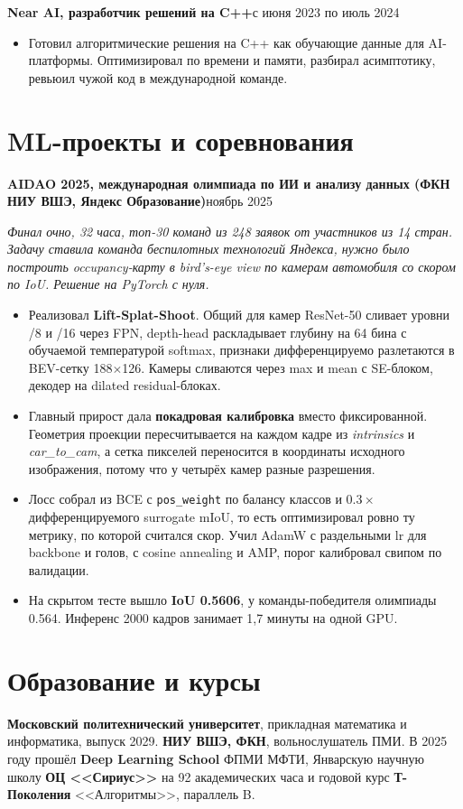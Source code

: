 \documentclass[10pt,a4paper]{article}
\newcommand{\role}[2]{\textbf{#1}\hfill #2\par}
\begin{document}
\role{Near AI, разработчик решений на C++}{с июня 2023 по июль 2024}
\begin{itemize}
  \item Готовил алгоритмические решения на C++ как обучающие данные для AI-платформы. Оптимизировал по времени
        и памяти, разбирал асимптотику, ревьюил чужой код в международной команде.
\end{itemize}

\section{ML-проекты и соревнования}

\role{AIDAO 2025, международная олимпиада по ИИ и анализу данных (ФКН НИУ ВШЭ, Яндекс Образование)}{ноябрь 2025}
\textit{Финал очно, 32 часа, топ-30 команд из 248 заявок от участников из 14 стран. Задачу ставила команда
беспилотных технологий Яндекса, нужно было построить occupancy-карту в bird's-eye view по камерам автомобиля
со скором по IoU. Решение на PyTorch с нуля.}
\begin{itemize}
  \item Реализовал \textbf{Lift-Splat-Shoot}. Общий для камер ResNet-50 сливает уровни /8 и /16 через FPN,
        depth-head раскладывает глубину на 64 бина с обучаемой температурой softmax, признаки дифференцируемо
        разлетаются в BEV-сетку 188$\times$126. Камеры сливаются через max и mean с SE-блоком, декодер на dilated
        residual-блоках.
  \item Главный прирост дала \textbf{покадровая калибровка} вместо фиксированной. Геометрия проекции пересчитывается
        на каждом кадре из \textit{intrinsics} и \textit{car\_to\_cam}, а сетка пикселей переносится в координаты
        исходного изображения, потому что у четырёх камер разные разрешения.
  \item Лосс собрал из BCE с \texttt{pos\_weight} по балансу классов и $0.3\times$ дифференцируемого surrogate mIoU,
        то есть оптимизировал ровно ту метрику, по которой считался скор. Учил AdamW с раздельными lr для backbone
        и голов, с cosine annealing и AMP, порог калибровал свипом по валидации.
  \item На скрытом тесте вышло \textbf{IoU 0.5606}, у команды-победителя олимпиады 0.564. Инференс 2000 кадров
        занимает 1,7 минуты на одной GPU.
\end{itemize}

\section{Образование и курсы}
\textbf{Московский политехнический университет}, прикладная математика и информатика, выпуск 2029.
\textbf{НИУ ВШЭ, ФКН}, вольнослушатель ПМИ. В 2025 году прошёл \textbf{Deep Learning School} ФПМИ МФТИ,
Январскую научную школу \textbf{ОЦ <<Сириус>>} на 92 академических часа и годовой курс \textbf{Т-Поколения}
<<Алгоритмы>>, параллель B.
\end{document}
